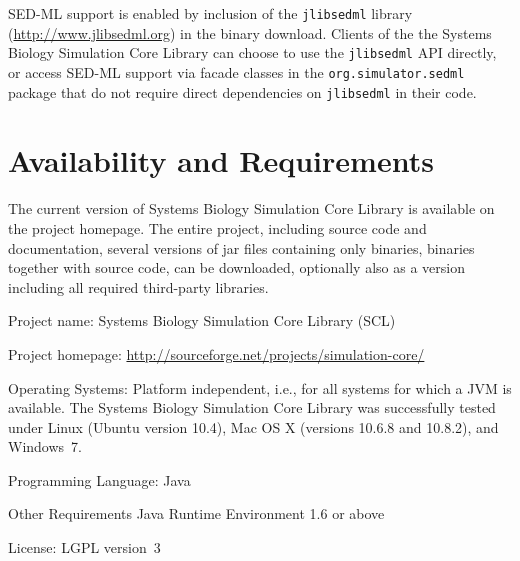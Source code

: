 \documentclass[10pt]{bmc_article}
\newenvironment{bmcformat}{\baselineskip20pt\sloppy\setboolean{publ}{false}}{\baselineskip20pt\sloppy}
\newcommand{\jlibsedml}{\texttt{jlibsedml}}
\begin{document}
\begin{bmcformat}
%
SED-ML support is enabled by inclusion of the \jlibsedml{} library
(\href{http://www.jlibsedml.org}{http://www.jlibsedml.org}) in the binary
download. Clients of the the Systems Biology Simulation Core Library can choose
to use the \jlibsedml{} API directly, or access SED-ML support via  facade
classes in the \texttt{org.simulator.sedml} package that do not require direct
dependencies on \jlibsedml{} in their code.


\section*{Availability and Requirements}
The current version of Systems Biology Simulation Core Library is available on
the project homepage. The entire project, including source code and
documentation, several versions of jar files containing only binaries, binaries
together with source code, can be downloaded, optionally also as a version
including all required third-party libraries.
\begin{description}
\item{Project name:}         Systems Biology Simulation Core Library (SCL)
\item{Project homepage:}     \url{http://sourceforge.net/projects/simulation-core/}
\item{Operating Systems:}    Platform independent, i.e., for all systems for which a JVM
is available. The Systems Biology Simulation Core Library was successfully 
tested under Linux (Ubuntu version 10.4), Mac OS X (versions 10.6.8 and 10.8.2),
and Windows~7.
\item{Programming Language:} Java\texttrademark
\item{Other Requirements}    Java Runtime Environment 1.6 or above
\item{License:}              LGPL version~3
\end{description}


\end{bmcformat}
\end{document}
